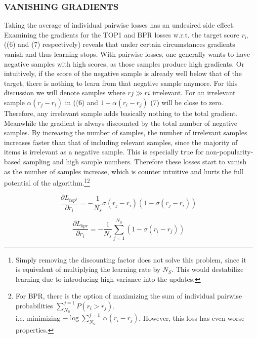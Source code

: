 \documentclass{article} %
\begin{document}
\subsubsection{VANISHING GRADIENTS}
Taking the average of individual pairwise losses has an undesired side effect. Examining the gradients for the TOP1 and BPR losses w.r.t. the target score $r_i$, ((6) and (7) respectively) reveals that
under certain circumstances gradients vanish and thus learning stops. With pairwise losses, one
generally wants to have negative samples with high scores, as those samples produce high gradients.
Or intuitively, if the score of the negative sample is already well below that of the target, there is
nothing to learn from that negative sample anymore. For this discussion we will denote samples
where $rj \gg ri$
irrelevant. For an irrelevant sample $\alpha(r_j − r_i)$ in ((6) and $1 − \alpha(r_i − r_j )$ (7) will be close to zero. Therefore, any irrelevant sample adds basically nothing to the total gradient.
Meanwhile the gradient is always discounted by the total number of negative samples. By increasing the number of samples, the number of irrelevant samples increases faster than that of including
relevant samples, since the majority of items is irrelevant as a negative sample. This is especially
true for non-popularity-based sampling and high sample numbers. Therefore these losses start to
vanish as the number of samples increase, which is counter intuitive and hurts the full potential of
the algorithm.\footnote[5]{Simply removing the discounting factor does not solve this problem, since it is equivalent of multiplying the learning rate by $N_S$. This would destabilize learning due to introducing high variance into the updates.}\footnote[6]{For BPR, there is the option of maximizing the sum of individual pairwise probabilities $\sum_{N_S}^{j=1}  P(r_i > r_j )$, \\
i.e. minimizing $− \log \sum_{N_S}^{j=1} \ \alpha(r_i − r_j )$. However, this loss has even worse properties.
}

\begin{equation}\label{eq:6}
    \frac{\partial L_{top^1}}{\partial r_i} = - \frac{1}{N_s} \sigma (r_j - r_i) (1 - \sigma (r_j - r_i))
\end{equation}

\begin{equation}\label{eq:7}
    \frac{\partial L_{bpr}}{\partial r_i} = - \frac{1}{N_s} \sum_{j=1}^{N_S} (1 - \sigma (r_i - r_j)  )
\end{equation}
\end{document}
